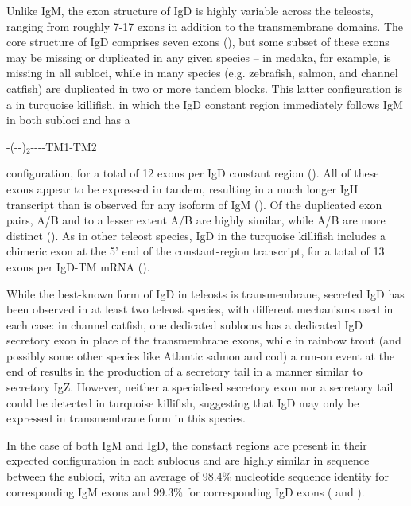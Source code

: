 		Unlike IgM, the exon structure of IgD is highly variable across the teleosts, ranging from roughly 7-17 \cd{} exons in addition to the transmembrane domains. The core structure of IgD comprises seven \cd{} exons (), but some subset of these exons may be missing or duplicated in any given species -- in medaka, for example,  is missing in all subloci, while in many species (e.g. zebrafish, salmon, and channel catfish)  are duplicated in two or more tandem blocks. This latter configuration is a in turquoise killifish, in which the IgD constant region immediately follows IgM in both subloci and has a 

-(--)$_2$----TM1-TM2 

	\noindent configuration, for a total of 12 exons per IgD constant region (). All of these exons appear to be expressed in tandem, resulting in a much longer IgH transcript than is observed for any isoform of IgM (). Of the duplicated exon pairs, A/B and to a lesser extent A/B are highly similar, while A/B are more distinct (). As in other teleost species, IgD in the turquoise killifish includes a chimeric  exon at the 5' end of the constant-region transcript, for a total of 13 exons per IgD-TM mRNA ().

	While the best-known form of IgD in teleosts is transmembrane, secreted IgD has been observed in at least two teleost species, with different mechanisms used in each case: in channel catfish, one dedicated sublocus has a dedicated IgD secretory exon in place of the transmembrane exons, while in rainbow trout (and possibly some other species like Atlantic salmon and cod) a run-on event at the end of  results in the production of a secretory tail in a manner similar to secretory IgZ. However, neither a specialised secretory exon nor a  secretory tail could be detected in turquoise killifish, suggesting that IgD may only be expressed in transmembrane form in this species. %
	
	In the case of both IgM and IgD, the constant regions are present in their expected configuration in each sublocus and are highly similar in sequence between the subloci, with an average of 98.4\% nucleotide sequence identity for corresponding IgM exons and 99.3\% for corresponding IgD exons ( and ).

